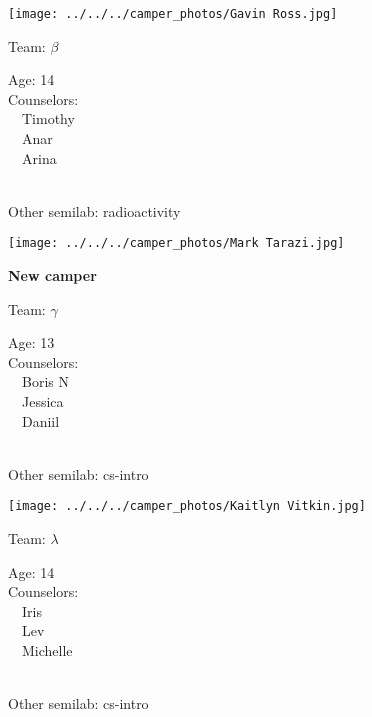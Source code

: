 \documentclass[10pt,letterpaper, landscape]{article}
\begin{document}
\verticalshiftfornextsticker
\renewcommand{\baselinestretch}{1} \begin{sticker}
\noindent\begin{minipage}{0.5\textwidth}\texttt{[image: ../../../camper\_photos/Gavin Ross.jpg]}\end{minipage}\begin{minipage}{0.45\textwidth}
Team: {\Large $\beta$}

Age:        14\\
Counselors: \\\ \ Timothy\\\ \ Anar\\\ \ Arina\\
\end{minipage} \\ \vspace{0.07in}
Other semilab: radioactivity
\end{sticker}
\horizontalshiftfornextsticker
\renewcommand{\baselinestretch}{1} \begin{sticker}
\noindent\begin{minipage}{0.5\textwidth}\texttt{[image: ../../../camper\_photos/Mark Tarazi.jpg]}\end{minipage}\begin{minipage}{0.45\textwidth}
\textbf{New camper} 

Team: {\Large $\gamma$}

Age:        13\\
Counselors: \\\ \ Boris N\\\ \ Jessica\\\ \ Daniil\\
\end{minipage} \\ \vspace{0.07in}
Other semilab: cs-intro
\end{sticker}
\horizontalshiftfornextsticker
\renewcommand{\baselinestretch}{1} \begin{sticker}
\noindent\begin{minipage}{0.5\textwidth}\texttt{[image: ../../../camper\_photos/Kaitlyn Vitkin.jpg]}\end{minipage}\begin{minipage}{0.45\textwidth}
Team: {\Large $\lambda$}

Age:        14\\
Counselors: \\\ \ Iris\\\ \ Lev\\\ \ Michelle\\
\end{minipage} \\ \vspace{0.07in}
Other semilab: cs-intro
\end{sticker}
\end{document}
